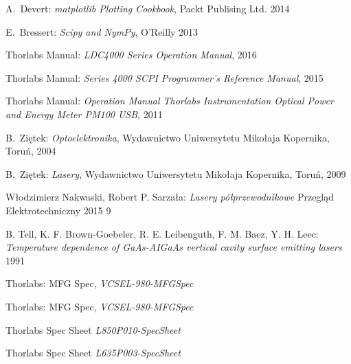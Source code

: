 \begin{thebibliography}{99}
  A.~Devert:
\emph{matplotlib Plotting Cookbook},
Packt Publising Ltd. 2014

 E.~Bressert:
\emph{Scipy and NymPy},
O'Reilly 2013

 Thorlabs Manual:
\emph{LDC4000 Series Operation Manual},
2016

 Thorlabs Manual:
\emph{Series 4000 SCPI Programmer's Reference Manual},
2015

 Thorlabs Manual:
\emph{Operation Manual
Thorlabs Instrumentation Optical Power and Energy Meter PM100 USB},
2011

  B.~Ziętek:
\emph{Optoelektronika},
Wydawnictwo Uniwersytetu Mikołaja Kopernika, Toruń, 2004

  B.~Ziętek:
\emph{Lasery},
Wydawnictwo Uniwersytetu Mikołaja Kopernika, Toruń, 2009

 Włodzimierz Nakwaski, Robert P. Sarzała:
\emph{Lasery półprzewodnikowe}
 Przegląd Elektrotechniczny 2015 9

 B. Tell, K. F. Brown-Goebeler, R. E. Leibenguth, F. M.  Baez, Y. H. Leec:
\emph{Temperature dependence of GaAs-AIGaAs vertical cavity surface emitting lasers }
1991


 Thorlabs:
MFG Spec,
\emph{VCSEL-980-MFGSpec}

 Thorlabs:
MFG Spec,
\emph{VCSEL-980-MFGSpec}

 Thorlabs
Spec Sheet
\emph{L850P010-SpecSheet}

 Thorlabs
Spec Sheet
\emph{L635P003-SpecSheet}
\end{thebibliography}
